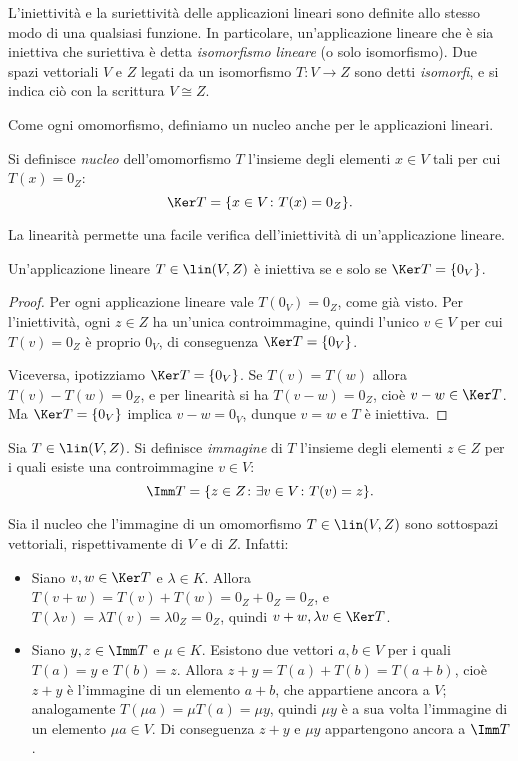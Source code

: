L'iniettività e la suriettività delle applicazioni lineari sono definite allo stesso modo di una qualsiasi funzione.
In particolare, un'applicazione lineare che è sia iniettiva che suriettiva è detta \emph{isomorfismo lineare} (o solo isomorfismo).
Due spazi vettoriali $V$ e $Z$ legati da un isomorfismo $T\colon V\to Z$ sono detti \emph{isomorfi}, e si indica ciò con la scrittura $V\cong Z$.

Come ogni omomorfismo, definiamo un nucleo anche per le applicazioni lineari.
\begin{definizione} \label{d:nucleo-applicazione-lineare}
	Si definisce \emph{nucleo} dell'omomorfismo $T$ l'insieme degli elementi $x\in V$ tali per cui $T(x)=0_Z$:
	\begin{equation*}
		\Ker T=\{x\in V\colon T(x)=0_Z\}.
	\end{equation*}
\end{definizione}
La linearità permette una facile verifica dell'iniettività di un'applicazione lineare.
\begin{teorema} \label{t:iniettivita-nucleo}
	Un'applicazione lineare $T\in\lin(V,Z)$ è iniettiva se e solo se $\Ker T=\{0_V\}$.
\end{teorema}
\begin{proof}
	Per ogni applicazione lineare vale $T(0_V)=0_Z$, come già visto.
	Per l'iniettività, ogni $z\in Z$ ha un'unica controimmagine, quindi l'unico $v\in V$ per cui $T(v)=0_Z$ è proprio $0_V$, di conseguenza $\Ker T=\{0_V\}$.

	Viceversa, ipotizziamo $\Ker T=\{0_V\}$.
	Se $T(v)=T(w)$ allora $T(v)-T(w)=0_Z$, e per linearità si ha $T(v-w)=0_Z$, cioè $v-w\in\Ker T$.
	Ma $\Ker T=\{0_V\}$ implica $v-w=0_V$, dunque $v=w$ e $T$ è iniettiva.
\end{proof}

\begin{definizione} \label{d:immagine-applicazione-lineare}
	Sia $T\in\lin(V,Z)$.
	Si definisce \emph{immagine} di $T$ l'insieme degli elementi $z\in Z$ per i quali esiste una controimmagine $v\in V$:
	\begin{equation*}
		\Imm T=\{z\in Z\colon\exists v\in V\colon T(v)=z\}.
	\end{equation*}
\end{definizione}
Sia il nucleo che l'immagine di un omomorfismo $T\in\lin(V,Z)$ sono sottospazi vettoriali, rispettivamente di $V$ e di $Z$.
Infatti:
\begin{itemize}
	\item Siano $v,w\in\Ker T$ e $\lambda \in K$.
		Allora $T(v+w)=T(v)+T(w)=0_Z+0_Z=0_Z$, e $T(\lambda v)=\lambda T(v)=\lambda 0_Z=0_Z$, quindi $v+w,\lambda v\in\Ker T$.
	\item Siano $y,z\in\Imm T$ e $\mu\in K$.
		Esistono due vettori $a,b\in V$ per i quali $T(a)=y$ e $T(b)=z$.
		Allora $z+y=T(a)+T(b)=T(a+b)$, cioè $z+y$ è l'immagine di un elemento $a+b$, che appartiene ancora a $V$; analogamente $T(\mu a)=\mu T(a)=\mu y$, quindi $\mu y$ è a sua volta l'immagine di un elemento $\mu a\in V$.
		Di conseguenza $z+y$ e $\mu y$ appartengono ancora a $\Imm T$.
\end{itemize}

